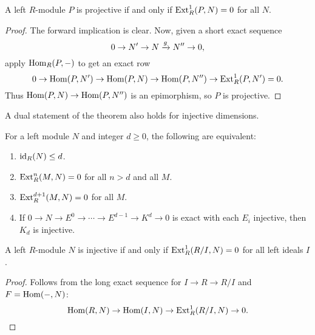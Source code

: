 \begin{lemma*}
	A left  \( R \)-module \( P \) is projective if and only if \( \operatorname{Ext}_R^1(P,N)=0 \) for all \( N \).
\end{lemma*}
\begin{proof}
	The forward implication is clear. Now, given a short exact sequence
	\[
		0 \to N' \to N \xrightarrow{g} N'' \to 0,
	\]
	apply \( \operatorname{Hom}_R(P,-) \) to get an exact row
	\[
		0\to\operatorname{Hom}(P,N')\to\operatorname{Hom}(P,N)\to\operatorname{Hom}(P,N'')\to \operatorname{Ext}_R^1(P,N')=0.
	\]
	Thus \( \operatorname{Hom}(P,N)\to\operatorname{Hom}(P,N'') \) is an epimorphism, so \( P \) is projective.
\end{proof}

A dual statement of the theorem also holds for injective dimensions.

\begin{theorem*}
	For a left module \( N \) and integer \( d\ge 0 \), the following are equivalent:
	\begin{enumerate}
		\item \( \operatorname{id}_R(N)\le d \).
		\item \( \operatorname{Ext}_R^{n}(M,N)=0 \) for all \( n>d \) and all \( M \).
		\item \( \operatorname{Ext}_R^{d+1}(M,N)=0 \) for all \( M \).
		\item  If \( 0\to N\to E^0\to\dotsm\to E^{d - 1} \to K^d\to 0 \) is exact with each \( E_i \) injective, then \( K_d \) is injective.
	\end{enumerate}
\end{theorem*}

\begin{lemma*}
	A left \( R \)-module \( N \) is injective if and only if \( \operatorname{Ext}^1_R(R/I, N) = 0 \) for all left ideals \( I \).
\end{lemma*}
\begin{proof}
	Follows from the long exact sequence for \( I \to R \to R/I \) and \( F = \operatorname{Hom}(-, N) \):
	\[
		\operatorname{Hom}(R, N) \to \operatorname{Hom}(I, N) \to \operatorname{Ext}_R^1(R/I, N) \to 0.
	\]
\end{proof}

